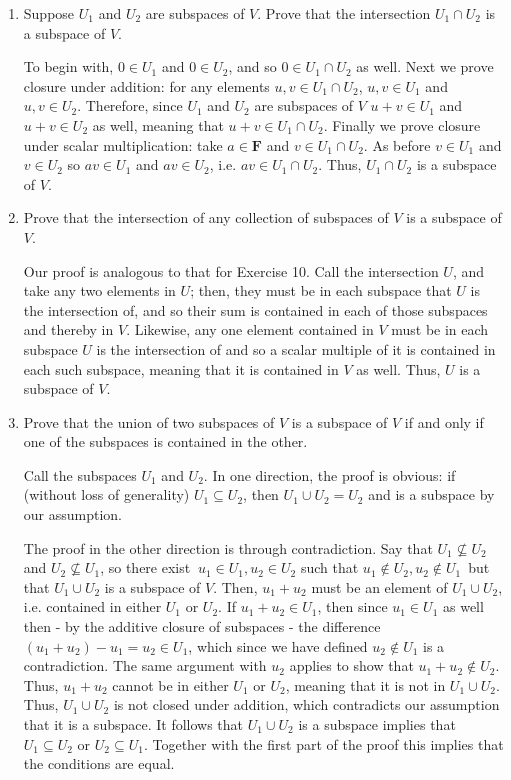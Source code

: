 \documentclass{book}
\begin{document}
\begin{enumerate}
\item Suppose \(U_1\) and \(U_2\) are subspaces of \(V\).  Prove that the intersection \(U_1 \cap U_2\) is a subspace of \(V\).

To begin with, \(0 \in U_1\) and \(0 \in U_2\), and so \(0 \in U_1 \cap U_2\) as well.  Next we prove closure under addition: for any elements \(u,v \in U_1 \cap U_2\), \(u,v \in U_1\) and \(u,v \in U_2\).  Therefore, since \(U_1\) and \(U_2\) are subspaces of \(V\) \(u+v \in U_1\) and \(u+v \in U_2\) as well, meaning that \(u+v \in U_1 \cap U_2\).  Finally we prove closure under scalar multiplication: take \(a \in \textbf{F}\) and \(v \in U_1 \cap U_2\).  As before \(v \in U_1\) and \(v \in U_2\) so \(av \in U_1\) and \(av \in U_2\), i.e. \(av \in U_1 \cap U_2\).  Thus, \(U_1 \cap U_2\) is a subspace of \(V\).

\item Prove that the intersection of any collection of subspaces of \(V\) is a subspace of \(V\).

Our proof is analogous to that for Exercise 10.  Call the intersection \(U\), and take any two elements in \(U\); then, they must be in each subspace that \(U\) is the intersection of, and so their sum is contained in each of those subspaces and thereby in \(V\).  Likewise, any one element contained in \(V\) must be in each subspace \(U\) is the intersection of and so a scalar multiple of it is contained in each such subspace, meaning that it is contained in \(V\) as well.  Thus, \(U\) is a subspace of \(V\).

\item Prove that the union of two subspaces of \(V\) is a subspace of \(V\) if and only if one of the subspaces is contained in the other.

Call the subspaces \(U_1\) and \(U_2\).  In one direction, the proof is obvious: if (without loss of generality) \(U_1 \subseteq U_2\), then \(U_1 \cup U_2 = U_2\) and is a subspace by our assumption.

The proof in the other direction is through contradiction.  Say that  \(U_1 \not\subseteq U_2\) and \(U_2 \not\subseteq U_1\), so there exist \(\ u_1 \in U_1,u_2 \in U_2\) such that \(u_1 \notin U_2, u_2 \notin U_1\)\, but that \(U_1 \cup U_2\) is a subspace of \(V\).  Then, \(u_1+u_2\) must be an element of \(U_1 \cup U_2\), i.e. contained in either \(U_1\) or \(U_2\).  If \(u_1 + u_2 \in U_1\), then since \(u_1 \in U_1\) as well then - by the additive closure of subspaces - the difference \((u_1+u_2)-u_1 = u_2 \in U_1\), which since we have defined \(u_2 \notin U_1\) is a contradiction.  The same argument with \(u_2\) applies to show that \(u_1+u_2 \notin U_2\).  Thus, \(u_1+u_2\) cannot be in either \(U_1\) or \(U_2\), meaning that it is not in \(U_1 \cup U_2\).  Thus, \(U_1 \cup U_2\) is not closed under addition, which contradicts our assumption that it is a subspace.  It follows that \(U_1 \cup U_2\) is a subspace implies that \(U_1 \subseteq U_2\) or \(U_2 \subseteq U_1\).  Together with the first part of the proof this implies that the conditions are equal.


\end{enumerate}
\end{document}

